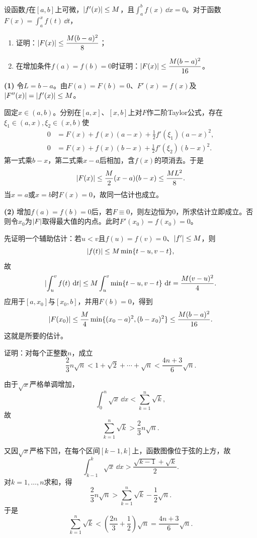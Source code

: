 \begin{xexercise}[4]
设函数$f$在$[a,b]$上可微，$\lvert f'(x)\rvert\le M$，且$\int_a^bf(x)\,\dd x=0$。对于函数$F(x)=\int_a^xf(t)\,\dd t$，
  \begin{enumerate}[label=(\arabic*)]
    \item 证明：$\lvert F(x)\rvert\le\dfrac{M(b-a)^2}{8}$；
    \item 在增加条件$f(a)=f(b)=0$时证明：$\lvert F(x)\rvert\le\dfrac{M(b-a)^2}{16}$。
  \end{enumerate}
\end{xexercise}
\begin{xsolution}
\textbf{(1)}\quad
令$L=b-a$。由$F(a)=F(b)=0$、$F'(x)=f(x)$及$\lvert F''(x)\rvert=\lvert f'(x)\rvert\le M$。

固定$x\in(a,b)$。分别在$[a,x]$、$[x,b]$上对$F$作二阶Taylor公式，存在$\xi_1\in(a,x),\xi_2\in(x,b)$使
\begin{align*}
0&=F(x)+f(x)(a-x)+\frac12f'(\xi_1)(a-x)^2,\\
0&=F(x)+f(x)(b-x)+\frac12f'(\xi_2)(b-x)^2.
\end{align*}
第一式乘$b-x$，第二式乘$x-a$后相加，含$f(x)$的项消去。于是
\[
 \lvert F(x)\rvert
 \le\frac M2(x-a)(b-x)
 \le\frac{ML^2}{8}.
\]
当$x=a$或$x=b$时$F(x)=0$，故同一估计也成立。

\textbf{(2)}\quad
增加$f(a)=f(b)=0$后，若$F\equiv0$，则左边恒为0，所求估计立即成立。否则令$x_0$为$\lvert F\rvert$取得最大值的内点。此时$F'(x_0)=f(x_0)=0$。

先证明一个辅助估计：若$u<v$且$f(u)=f(v)=0$、$\lvert f'\rvert\le M$，则
\[
 \lvert f(t)\rvert\le M\min\{t-u,v-t\},
\]
故
\[
 \lvert\int_u^vf(t)\,\mathop{}\!\mathrm{d} t\rvert
 \le M\int_u^v\min\{t-u,v-t\}\,\mathop{}\!\mathrm{d} t
 =\frac{M(v-u)^2}{4}.
\]
应用于$[a,x_0]$与$[x_0,b]$，并用$F(b)=0$，得到
\[
 \lvert F(x_0)\rvert
 \le\frac M4\min\{(x_0-a)^2,(b-x_0)^2\}
 \le\frac{M(b-a)^2}{16}.
\]
这就是所要的估计。
\end{xsolution}


\begin{xexercise}[5]
证明：对每个正整数$n$，成立
  \[
    \frac23n\sqrt n<1+\sqrt2+\cdots+\sqrt n<\frac{4n+3}{6}\sqrt n.
  \]
\end{xexercise}
\begin{xsolution}
由于$\sqrt x$严格单调增加，
\[
 \int_0^n\sqrt x\,\dd x
 <\sum_{k=1}^n\sqrt k,
\]
故
\[
 \sum_{k=1}^n\sqrt k>\frac23n\sqrt n.
\]

又因$\sqrt x$严格下凹，在每个区间$[k-1,k]$上，函数图像位于弦的上方，故
\[
 \int_{k-1}^k\sqrt x\,\dd x
 >\frac{\sqrt{k-1}+\sqrt k}{2}.
\]
对$k=1,\ldots,n$求和，得
\[
 \frac23n\sqrt n
 >\sum_{k=1}^n\sqrt k-\frac12\sqrt n.
\]
于是
\[
 \sum_{k=1}^n\sqrt k
 <\left(\frac{2n}{3}+\frac12\right)\sqrt n
 =\frac{4n+3}{6}\sqrt n.
\]
\end{xsolution}


